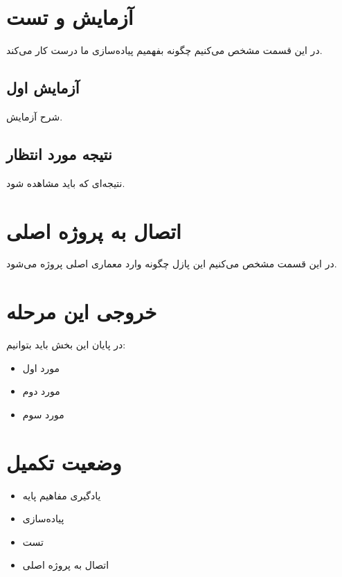 \section{آزمایش و تست}

در این قسمت مشخص می‌کنیم چگونه بفهمیم
پیاده‌سازی ما درست کار می‌کند.


\subsection{آزمایش اول}

شرح آزمایش.


\subsection{نتیجه مورد انتظار}

نتیجه‌ای که باید مشاهده شود.



\section{اتصال به پروژه اصلی}

در این قسمت مشخص می‌کنیم این پازل
چگونه وارد معماری اصلی پروژه می‌شود.



\section{خروجی این مرحله}

در پایان این بخش باید بتوانیم:

\begin{itemize}

    \item مورد اول
    \item مورد دوم
    \item مورد سوم

\end{itemize}



\section{وضعیت تکمیل}

\begin{itemize}

    \item یادگیری مفاهیم پایه
    \item پیاده‌سازی
    \item تست
    \item اتصال به پروژه اصلی

\end{itemize}



















